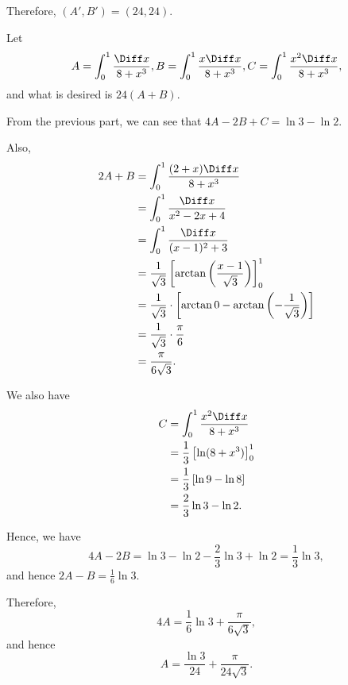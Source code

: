 \begin{enumerate}
          Therefore, \((A', B') = (24, 24)\).

          Let
          \[
              A = \int_{0}^{1} \frac{\Diff x}{8 + x^3}, B = \int_{0}^{1} \frac{x \Diff x}{8 + x^3}, C = \int_{0}^{1} \frac{x^2 \Diff x}{8 + x^3},
          \]
          and what is desired is \(24(A + B)\).

          From the previous part, we can see that \(4A - 2B + C = \ln 3 - \ln 2\).

          Also,
          \begin{align*}
              2A + B & = \int_{0}^{1} \frac{(2 + x) \Diff x}{8 + x^3}                                                \\
                     & = \int_{0}^{1} \frac{\Diff x}{x^2 - 2x + 4}                                                   \\
                     & = \int_{0}^{1} \frac{\Diff x}{(x - 1)^2 + 3}                                                  \\
                     & = \frac{1}{\sqrt{3}} \left[\arctan\left(\frac{x - 1}{\sqrt{3}}\right)\right]_{0}^{1}          \\
                     & = \frac{1}{\sqrt{3}} \cdot \left[\arctan 0 - \arctan \left(- \frac{1}{\sqrt{3}}\right)\right] \\
                     & = \frac{1}{\sqrt{3}} \cdot \frac{\pi}{6}                                                      \\
                     & = \frac{\pi}{6\sqrt{3}}.
          \end{align*}

          We also have
          \begin{align*}
              C & = \int_{0}^{1} \frac{x^2 \Diff x}{8 + x^3}       \\
                & = \frac{1}{3} \left[\ln (8 + x^3)\right]_{0}^{1} \\
                & = \frac{1}{3} \left[\ln 9 - \ln 8\right]         \\
                & = \frac{2}{3} \ln 3 - \ln 2.
          \end{align*}

          Hence, we have
          \[
              4A - 2B = \ln 3 - \ln 2 - \frac{2}{3} \ln 3 + \ln 2 = \frac{1}{3} \ln 3,
          \]
          and hence \(2A - B = \frac{1}{6} \ln 3\).

          Therefore,
          \[
              4A = \frac{1}{6} \ln 3 + \frac{\pi}{6\sqrt{3}},
          \]
          and hence
          \[
              A = \frac{\ln 3}{24} + \frac{\pi}{24\sqrt{3}}.
          \]


\end{enumerate}
